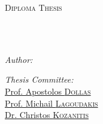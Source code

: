 \documentclass[
	12pt, %
	english, %
	singlespacing, %
	liststotoc, %
	toctotoc, %
	parskip, %
	headsepline, %
]{MastersDoctoralThesis} %
\author{Tzanis \textsc{Fotakis}} %
\begin{document}
\frontmatter %

\pagestyle{plain} %


\begin{titlepage}
	\begin{center}

		\vspace*{.06\textheight}
		{\scshape\LARGE \univname\par}\vspace{1.5cm} %
		\textsc{\Large Diploma Thesis}\\[0.5cm] %

		\HRule \\[0.4cm] %
		{\huge \bfseries \ttitle\par}\vspace{0.4cm} %
		\HRule \\[1.5cm] %

		\begin{minipage}[t]{0.4\textwidth}
			\begin{flushleft} \large
				\emph{Author:}\\
				\href{https://www.linkedin.com/in/fotakistzanis/}{\authorname} %
			\end{flushleft}
		\end{minipage}
		\begin{minipage}[t]{0.5\textwidth}
			\begin{flushright} \large
				\emph{Thesis Committee:} \\
				\href{https://www.ece.tuc.gr/index.php?id=4531&tx_tuclabspersonnel_list%5Bperson%5D=289&tx_tuclabspersonnel_list%5Baction%5D=person&tx_tuclabspersonnel_list%5Bcontroller%5D=List}{Prof. Apostolos \textsc{Dollas}}\\ %
				\href{https://www.ece.tuc.gr/index.php?id=4531&tx_tuclabspersonnel_list%5Bperson%5D=313&tx_tuclabspersonnel_list%5Baction%5D=person&tx_tuclabspersonnel_list%5Bcontroller%5D=List}{Prof. Michail \textsc{Lagoudakis}}\\
				\href{https://www.linkedin.com/in/christos-kozanitis-a3b173a8/}{Dr. Christos \textsc{Kozanitis}}
			\end{flushright}
		\end{minipage}\\[0.2cm]


\end{center}
\end{titlepage}
\end{document}

